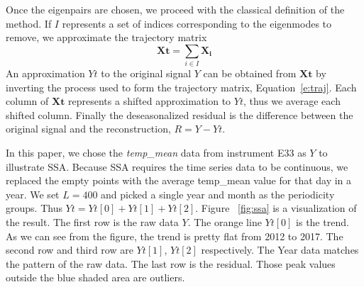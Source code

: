\documentclass[letterpaper, 10 pt, conference]{ieeeconf}  %
\begin{document}
%

Once the eigenpairs are chosen, we proceed with the classical definition of the method. If $I$ represents a set of indices corresponding to the eigenmodes to remove, we approximate the trajectory matrix
%
\begin{equation*}
    \mathbf{Xt} = \sum_{i\in I} \mathbf{X_i}
\end{equation*}
%
An approximation $Yt$ to the original signal $Y$ can be obtained from $\mathbf{Xt}$ by inverting the process used to form the trajectory matrix, Equation~\eqref{e:traj}. Each column of $\mathbf{Xt}$ represents a shifted approximation to $Yt$, thus we average each shifted column. Finally the deseasonalized residual is the difference between the original signal and the reconstruction, $R=Y-Yt$.

In this paper, we chose the \textit{temp\_mean} data from instrument E33 as $Y$ to illustrate SSA. Because SSA requires the time series data to be continuous, we replaced the empty points with the average temp\_mean value for that day in a year. We set $L = 400$ and picked a single year and month as the periodicity groups. Thus $Yt = Yt[0] + Yt[1] + Yt[2]$. Figure~ \ref{fig:ssa} is a visualization of the result. The first row is the raw data $Y$. The orange line $Yt[0]$ is the trend. As we can see from the figure, the trend is pretty flat from 2012 to 2017. The second row and third row are $Yt[1]$, $Yt[2]$ respectively. The Year data matches the pattern of the raw data. The last row is the residual. Those peak values outside the blue shaded area are outliers.
\end{document}
